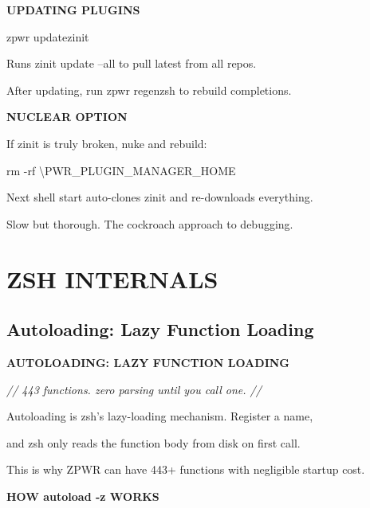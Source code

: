 \documentclass[11pt,a4paper,twoside]{book}
\begin{document}
\vspace{12pt}
{\bfseries\color{neonyellow} UPDATING PLUGINS}\vspace{4pt}

\begin{codebox}
zpwr updatezinit\\
\end{codebox}

Runs zinit update --all to pull latest from all repos.

\begin{codebox}
After updating, run zpwr regenzsh to rebuild completions.\\
\end{codebox}


\vspace{12pt}
{\bfseries\color{neonyellow} NUCLEAR OPTION}\vspace{4pt}

If zinit is truly broken, nuke and rebuild:

rm -rf \textbackslash{}PWR\_PLUGIN\_MANAGER\_HOME

Next shell start auto-clones zinit and re-downloads everything.

Slow but thorough. The cockroach approach to debugging.


\vspace{16pt}


\chapter{ZSH INTERNALS}

\section{Autoloading: Lazy Function Loading}


\vspace{10pt}
{\large\bfseries\color{neoncyan} AUTOLOADING: LAZY FUNCTION LOADING}\vspace{6pt}

{\small\itshape\color{dimtext} // 443 functions. zero parsing until you call one. //}

Autoloading is zsh's lazy-loading mechanism. Register a name,

and zsh only reads the function body from disk on first call.

This is why ZPWR can have 443+ functions with negligible startup cost.


\vspace{12pt}
{\bfseries\color{neonyellow} HOW autoload -z WORKS}\vspace{4pt}
\end{document}

